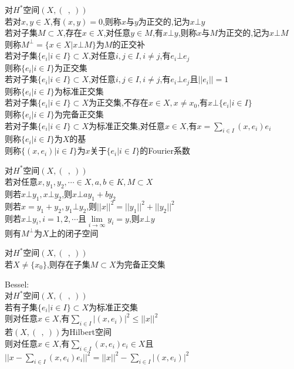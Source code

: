 \begin{dingyi}
对$H^*$空间$(X,(\ \ ,\ ))$\\
若对$x,y\in X$,有$(x,y)=0$,则称$x$与$y$为正交的,记为$x\bot y$\\
若对子集$M\subset X$,存在$x\in X$,对任意$y\in M$,有$x\bot y$,则称$x$与$M$为正交的,记为$x\bot M$\\
则称$M^{\bot}=\{x\in X|x\bot M\}$为$M$的正交补\\
若对子集$\{e_i|i\in I\}\subset X$,对任意$i,j\in I,i\neq j$,有$e_i\bot e_j$\\
则称$\{e_i|i\in I\}$为正交集\\
若对子集$\{e_i|i\in I\}\subset X$,对任意$i,j\in I,i\neq j$,有$e_i\bot e_j$且$||e_i||=1$\\
则称$\{e_i|i\in I\}$为标准正交集\\
若对子集$\{e_i|i\in I\}\subset X$为正交集,不存在$x\in X,x\neq x_0$,有$x\bot \{e_i|i\in I\}$\\
则称$\{e_i|i\in I\}$为完备正交集\\
若对子集$\{e_i|i\in I\}\subset X$为标准正交集,对任意$x\in X$,有$x=\sum\limits_{i\in I}(x,e_i)e_i$\\
则称$\{e_i|i\in I\}$为$X$的基\\
则称$\{(x,e_i)|i\in I\}$为$x$关于$\{e_i|i\in I\}$的Fourier系数
\end{dingyi}

\begin{dingli}
对$H^*$空间$(X,(\ \ ,\ ))$\\
若对任意$x,y_1,y_2,\cdots\in X,a,b\in K,M\subset X$\\
则若$x\bot y_1,x\bot y_2$,则$x\bot ay_1+by_2$\\
则若$x=y_1+y_2,y_1\bot y_2$,则$||x||^2=||y_1||^2+||y_2||^2$\\
则若$x\bot y_i,i=1,2,\cdots$且$\lim\limits_{i\to\infty}y_i=y$,则$x\bot y$\\
则有$M^{\bot}$为$X$上的闭子空间
\end{dingli}

\begin{dingli}
对$H^*$空间$(X,(\ \ ,\ ))$\\
若$X\neq \{x_0\}$,则存在子集$M\subset X$为完备正交集
\end{dingli}

\begin{dingli}
Bessel:\\
对$H^*$空间$(X,(\ \ ,\ ))$\\
若有子集$\{e_i|i\in I\}\subset X$为标准正交集\\
则对任意$x\in  X$,有$\sum\limits_{i\in I}|(x,e_i)|^2\leq ||x||^2$\\
若$(X,(\ \ ,\ ))$为Hilbert空间\\
则对任意$x\in  X$,有$\sum\limits_{i\in I}(x,e_i)e_i\in X$且$||x-\sum\limits_{i\in I}(x,e_i)e_i||^2=||x||^2-\sum\limits_{i\in I}|(x,e_i)|^2$
\end{dingli}

